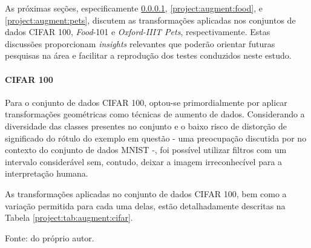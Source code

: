 As próximas seções, especificamente \ref{project:augment:cifar}, \ref{project:augment:food}, e \ref{project:augment:pets}, discutem as transformações aplicadas nos conjuntos de dados CIFAR 100, \textit{Food}-101 e \textit{Oxford-IIIT Pets}, respectivamente. Estas discussões proporcionam \textit{insights} relevantes que poderão orientar futuras pesquisas na área e facilitar a reprodução dos testes conduzidos neste estudo.

\paragraph{CIFAR 100}
\label{project:augment:cifar}
Para o conjunto de dados CIFAR 100, optou-se primordialmente por aplicar transformações geométricas como técnicas de aumento de dados. Considerando a diversidade das classes presentes no conjunto e o baixo risco de distorção de significado do rótulo do exemplo em questão - uma preocupação discutida por \cite{Shorten2019ALearning} no contexto do conjunto de dados MNIST -, foi possível utilizar filtros com um intervalo considerável sem, contudo, deixar a imagem irreconhecível para a interpretação humana.

As transformações aplicadas no conjunto de dados CIFAR 100, bem como a variação permitida para cada uma delas, estão detalhadamente descritas na Tabela \ref{project:tab:augment:cifar}.

\begin{table}[H]
    \centering
    \caption{Transformações geométricas aplicadas no conjunto de dados CIFAR 100.}
    \label{project:tab:augment:cifar}

    \vspace*{1 cm}
    Fonte: do próprio autor.
\end{table}

